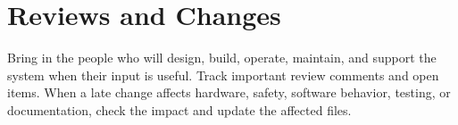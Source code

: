 \section{Reviews and Changes}
Bring in the people who will design, build, operate, maintain, and support the system when their input is useful. Track important review comments and open items. When a late change affects hardware, safety, software behavior, testing, or documentation, check the impact and update the affected files.
